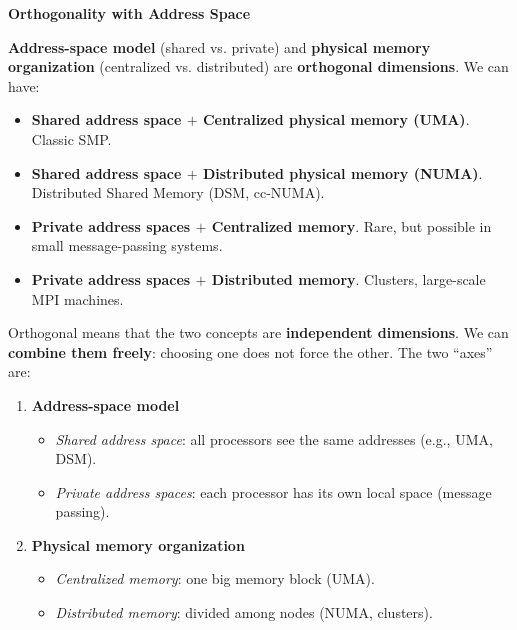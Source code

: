 \highspace
\begin{flushleft}
    \textcolor{Green3}{ \textbf{Orthogonality with Address Space}}
\end{flushleft}
\textbf{Address-space model} (shared vs. private) and \textbf{physical memory organization} (centralized vs. distributed) are \textbf{orthogonal dimensions}. We can have:
\begin{itemize}
    \item \textbf{Shared address space $+$ Centralized physical memory (UMA)}. Classic SMP.
    \item \textbf{Shared address space $+$ Distributed physical memory (NUMA)}. Distributed Shared Memory (DSM, cc-NUMA).
    \item \textbf{Private address spaces $+$ Centralized memory}. Rare, but possible in small message-passing systems.
    \item \textbf{Private address spaces $+$ Distributed memory}. Clusters, large-scale MPI machines.
\end{itemize}
Orthogonal means that the two concepts are \textbf{independent dimensions}. We can \textbf{combine them freely}: choosing one does not force the other. The two ``axes'' are:
\begin{enumerate}
    \item \textbf{Address-space model}
    \begin{itemize}
        \item \emph{Shared address space}: all processors see the same addresses (e.g., UMA, DSM).
        \item \emph{Private address spaces}: each processor has its own local space (message passing).
    \end{itemize}
    \item \textbf{Physical memory organization}
    \begin{itemize}
        \item \emph{Centralized memory}: one big memory block (UMA).
        \item \emph{Distributed memory}: divided among nodes (NUMA, clusters).
    \end{itemize}
\end{enumerate}